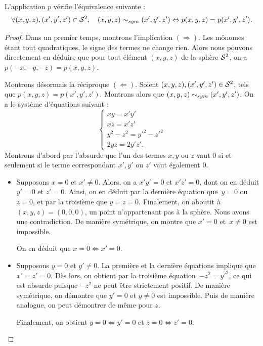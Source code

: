 \documentclass[hidelinks, 10pt]{article}
\begin{document}
\begin{proposition}\label{prop:projective-relation}
L'application $p$ vérifie l'équivalence suivante : \begin{equation*}
\forall(x,y,z),(x',y',z')\in\mathcal{S}^{2},\quad (x,y,z)\sim_{sym}(x',y',z')\Leftrightarrow p(x,y,z)=p(x',y',z').
\end{equation*}
\end{proposition}
\begin{proof}
Dans un premier temps, montrons l'implication $(\Rightarrow)$. Les mônomes étant tout quadratiques, le signe des termes ne change rien. Alors nous pouvons directement en déduire que pour tout élément $(x,y,z)$ de la sphère $\mathcal{S}^{2}$, on a $p(-x,-y,-z)=p(x,y,z)$.

\bigskip Montrons désormais la réciproque $(\Leftarrow)$. Soient $(x,y,z),(x',y',z')\in \mathcal{S}^{2}$, tels que $p(x,y,z)=p(x',y',z')$. Montrons alors que $(x,y,z)\sim_{sym}(x',y',z')$. On a le système d'équations suivant : \begin{equation*}
\left\{\begin{matrix}
xy=x'y'\\ 
xz=x'z'\\ 
y^2-z^2=y'^2-z'^2\\ 
2yz=2y'z'.
\end{matrix}\right.
\end{equation*}
Montrons d'abord par l'absurde que l'un des termes $x,y$ ou $z$ vaut 0 si et seulement si le terme correspondant $x',y'$ ou $z'$ vaut également 0.\begin{itemize}
    \item Supposons $x=0$ et $x'\neq0$. Alors, on a $x'y'=0$ et $x'z'=0$, dont on en déduit $y'=0$ et $z'=0$. Ainsi, on en déduit par la dernière équation que~$y=0$ ou $z=0$, et par la troisième que $y=z=0$. Finalement, on aboutit à $(x,y,z)=(0,0,0)$, un point n'appartenant pas à la sphère. Nous avons une contradiction. De manière symétrique, on montre que $x'=0$ et~$x\neq0$ est impossible.

    On en déduit que $x=0\Leftrightarrow x'=0$.
    \item Supposons $y=0$ et $y'\neq0$. La première et la dernière équations implique que $x'=z'=0$. Dès lors, on obtient par la troisième équation~$-z^2=y'^2$, ce qui est absurde puisque $-z^2$ ne peut être strictement positif. De manière symétrique, on démontre que $y'=0$ et $y\neq0$ est impossible. Puis de manière analogue, on peut démontrer de même pour $z$.

    Finalement, on obtient $y=0\Leftrightarrow y'=0$ et $z=0\Leftrightarrow z'=0$.
\end{itemize}


\end{proof}
\end{document}
